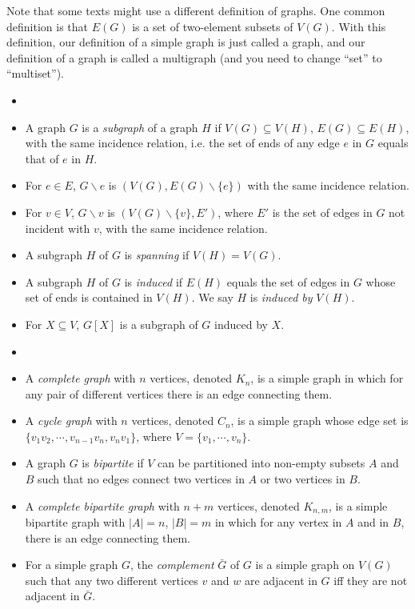         Note that some texts might use a different definition of graphs. One common definition is that $E(G)$ is a set of two-element subsets of $V(G)$. With this definition, our definition of a simple graph is just called a graph, and our definition of a graph is called a multigraph (and you need to change ``set'' to ``multiset'').
        
        \begin{defn}[Subgraph] \label{def_subgraph} \begin{itemize}
            \item[]
            \item A graph $G$ is a \emph{subgraph} of a graph $H$ if $V(G) \subseteq V(H)$, $E(G) \subseteq E(H)$, with the same incidence relation, i.e. the set of ends of any edge $e$ in $G$ equals that of $e$ in $H$.
            \item For $e \in E$, $G \backslash e$ is $(V(G), E(G) \backslash \{e\})$ with the same incidence relation.
            \item For $v \in V$, $G \backslash v$ is $(V(G) \backslash \{v\}, E')$, where $E'$ is the set of edges in $G$ not incident with $v$, with the same incidence relation.
            \item A subgraph $H$ of $G$ is \emph{spanning} if $V(H) = V(G)$.
            \item A subgraph $H$ of $G$ is \emph{induced} if $E(H)$ equals the set of edges in $G$ whose set of ends is contained in $V(H)$. We say $H$ is \emph{induced by} $V(H)$.
            \item For $X \subseteq V$, $G[X]$ is a subgraph of $G$ induced by $X$.
        \end{itemize} \end{defn}
        
        \begin{defn} \label{def_graph_example} \begin{itemize}
            \item[]
            \item A \emph{complete graph} with $n$ vertices, denoted $K_n$, is a simple graph in which for any pair of different vertices there is an edge connecting them.
            \item A \emph{cycle graph} with $n$ vertices, denoted $C_n$, is a simple graph whose edge set is $\{v_1v_2, \cdots, v_{n-1}v_n, v_nv_1\}$, where $V = \{v_1, \cdots, v_n\}$.
            \item A graph $G$ is \emph{bipartite} if $V$ can be partitioned into non-empty subsets $A$ and $B$ such that no edges connect two vertices in $A$ or two vertices in $B$.
            \item A \emph{complete bipartite graph} with $n+m$ vertices, denoted $K_{n,m}$, is a simple bipartite graph with $|A|=n$, $|B|=m$ in which for any vertex in $A$ and in $B$, there is an edge connecting them.
            \item For a simple graph $G$, the \emph{complement} $\bar{G}$ of $G$ is a simple graph on $V(G)$ such that any two different vertices $v$ and $w$ are adjacent in $G$ iff they are not adjacent in $\bar{G}$.
        \end{itemize} \end{defn}
        

